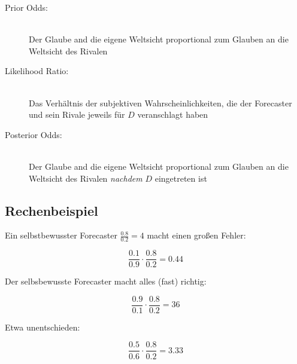 \begin{description}

\item[Prior Odds:] \hfill \\
Der Glaube and die eigene Weltsicht proportional zum Glauben an die Weltsicht des Rivalen
\item[Likelihood Ratio:] \hfill \\
Das Verhältnis der subjektiven Wahrscheinlichkeiten, die der Forecaster und sein Rivale jeweils für $D$ veranschlagt haben
\item[Posterior Odds:] \hfill \\
Der Glaube and die eigene Weltsicht proportional zum Glauben an die Weltsicht des Rivalen \emph{nachdem} $D$ eingetreten ist
\end{description}

\subsection{Rechenbeispiel}

Ein selbstbewusster Forecaster $\frac{0.8}{0.2} = 4$ macht einen großen Fehler:

\begin{equation*}
\frac{0.1}{0.9} \cdot \frac{0.8}{0.2} = 0.44
\end{equation*}

Der selbsbewusste Forecaster macht alles (fast) richtig:

\begin{equation*}
\frac{0.9}{0.1} \cdot \frac{0.8}{0.2} = 36
\end{equation*}

Etwa unentschieden:

\begin{equation*}
\frac{0.5}{0.6} \cdot \frac{0.8}{0.2} = 3.33
\end{equation*}